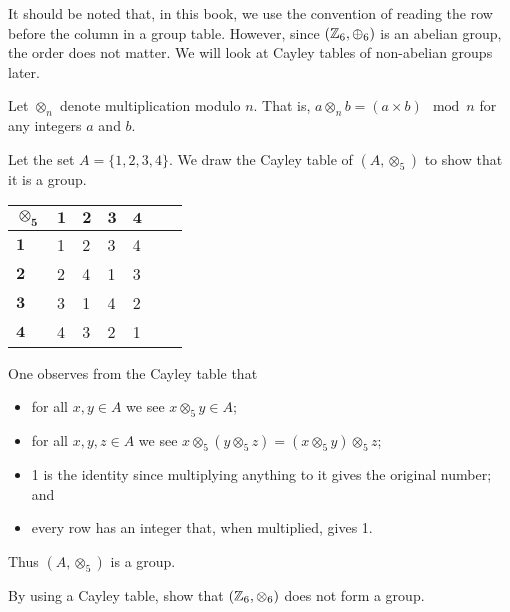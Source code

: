 It should be noted that, in this book, we use the convention of reading the row before the column in a group table. However, since $(\mathbb{Z}_6, \oplus_6)$ is an abelian group, the order does not matter. We will look at Cayley tables of non-abelian groups later.

\begin{definition}
    Let $\otimes_n$ denote multiplication modulo $n$. That is, $a \otimes_n b = (a \times b) \mod{n}$ for any integers $a$ and $b$.
\end{definition}
\begin{example}
    Let the set $A = \{1, 2, 3, 4\}$. We draw the Cayley table of $(A, \otimes_5)$ to show that it is a group.
    \begin{table}[h]
        \centering
        \begin{tabular}{|l|l|l|l|l|l|l|}
        \hline
        $\boldsymbol{\otimes_5}$ & $\boldsymbol{1}$ & $\boldsymbol{2}$ & $\boldsymbol{3}$ & $\boldsymbol{4}$ \\ \hline
        $\boldsymbol{1}$ & 1 & 2 & 3 & 4 \\ \hline
        $\boldsymbol{2}$ & 2 & 4 & 1 & 3 \\ \hline
        $\boldsymbol{3}$ & 3 & 1 & 4 & 2 \\ \hline
        $\boldsymbol{4}$ & 4 & 3 & 2 & 1 \\ \hline
        \end{tabular}
    \end{table}

    One observes from the Cayley table that
    \begin{itemize}
        \item for all $x, y \in A$ we see $x \otimes_5 y \in A$;
        \item for all $x, y, z \in A$ we see $x \otimes_5 (y \otimes_5 z) = (x \otimes_5 y) \otimes_5 z$;
        \item 1 is the identity since multiplying anything to it gives the original number; and
        \item every row has an integer that, when multiplied, gives 1.
    \end{itemize}
    Thus $(A, \otimes_5)$ is a group.
\end{example}

\begin{exercise}
    By using a Cayley table, show that $(\mathbb{Z}_6, \otimes_6)$ does not form a group.
\end{exercise}


